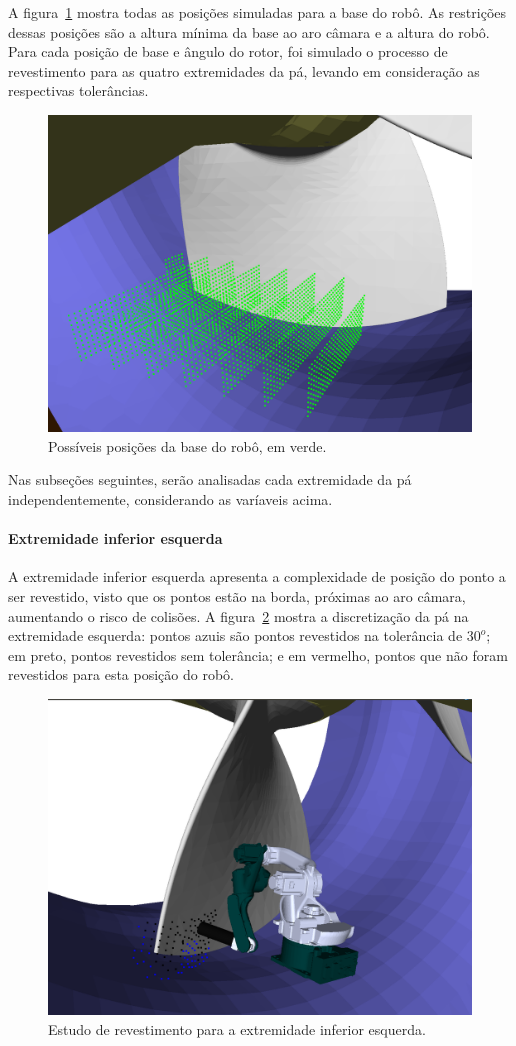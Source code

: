 A figura~\ref{fig::trilho2all} mostra todas as posições simuladas para a base do
robô. As restrições dessas posições são a altura mínima da base ao aro câmara e
a altura do robô. Para cada posição de base e ângulo do rotor, foi simulado o
processo de revestimento para as quatro extremidades da pá, levando em
consideração as respectivas tolerâncias.

\begin{figure}[!ht]
	\centering	
	\includegraphics[width=0.7\columnwidth]{method/figs/trilho2all.png}
	\caption{Possíveis posições da base do robô, em verde.}
	\label{fig::trilho2all}
\end{figure}

Nas subseções seguintes, serão analisadas cada extremidade da
pá independentemente, considerando as varíaveis acima.

\paragraph{Extremidade inferior esquerda}

A extremidade inferior esquerda apresenta a complexidade de posição do ponto a
ser revestido, visto que os pontos estão na borda, próximas ao aro câmara,
aumentando o risco de colisões. A figura~\ref{fig::footleft} mostra a
discretização da pá na extremidade esquerda: pontos azuis são pontos revestidos
na tolerância de $30^o$; em preto, pontos revestidos sem tolerância; e em
vermelho, pontos que não foram revestidos para esta posição do robô.

\begin{figure}[!ht]
	\centering	
	\includegraphics[width=0.7\columnwidth]{method/figs/footleft.png}
	\caption{Estudo de revestimento para a extremidade inferior esquerda.}
	\label{fig::footleft}
\end{figure}

